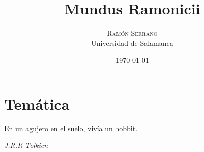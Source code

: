 \documentclass[twoside]{article}
\title{Mundus Ramonicii} %
\author{%
\textsc{Ramón Serrano} \\[1ex] %
\normalsize Universidad de Salamanca \\ %
}
\date{\today} %
\newcommand\myemptypage{
    \null{}
    \thispagestyle{empty}
    \addtocounter{page}{-1}
    \newpage
    }
\begin{document}
\maketitle
\myemptypage{}
\pagestyle{empty}
\tableofcontents
\restoregeometry{}
\myemptypage{}


\pagestyle{fancy}


\hypertarget{i-temuxe1tica}{%
  \section{Temática}\label{i-temuxe1tica}}
\epigraph{En un agujero en el suelo, vivía un hobbit.}{\textit{J.R.R Tolkien}}
\end{document}
